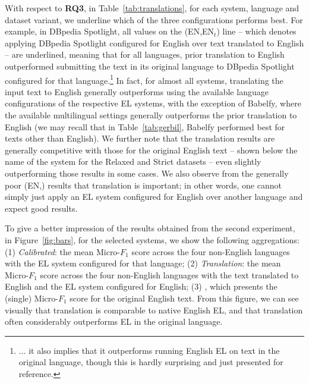 \documentclass{llncs}
\begin{document}

With respect to \textbf{RQ3}, in Table~\ref{tab:translations}, for each system, language and dataset variant, we underline which of the three configurations performs best. For example, in DBpedia Spotlight, all values on the (EN,EN$_t$) line -- which denotes applying DBpedia Spotlight configured for English over text translated to English -- are underlined, meaning that for all languages, prior translation to English outperformed submitting the text in its original language to DBpedia Spotlight configured for that language.\footnote{$\ldots$ it also implies that it outperforms running English EL on text in the original language, though this is hardly surprising and just presented for reference.}
In fact, for almost all systems, translating the input text to English generally outperforms using the available language configurations of the respective EL systems, with the exception of Babelfy, where the available multilingual settings generally outperforms the prior translation to English (we may recall that in Table~\ref{tab:gerbil}, Babelfy performed best for texts other than English). We further note that the translation results are generally competitive with those for the original English text -- shown below the name of the system for the Relaxed and Strict datasets -- even slightly outperforming those results in some cases. We also observe from the generally poor (EN,\blank) results that translation is important; in other words, one cannot simply just apply an EL system configured for English over another language and expect good results.

To give a better impression of the results obtained from the second experiment, in Figure~\ref{fig:bars}, for the selected systems, we show the following aggregations: (1) \textit{Calibrated}: the mean Micro-$F_1$ score across the four non-English languages with the EL system configured for that language; (2) \textit{Translation}: the mean Micro-$F_1$ score across the four non-English languages with the text translated to English and the EL system configured for English; (3) , which presents the (single) Micro-$F_1$ score for the original English text. From this figure, we can see visually that translation is comparable to native English EL, and that translation often considerably outperforms EL in the original language. 
\end{document}

